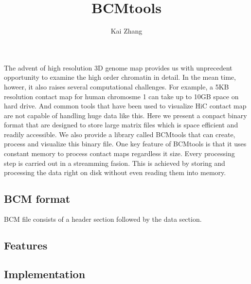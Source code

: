 \documentclass[12pt]{scrartcl}
\title{BCMtools}
\author{Kai Zhang}
\date{}
\begin{document}
\maketitle

The advent of high resolution 3D genome map provides us with unprecedent
opportunity to examine the high order chromatin in detail. In the mean time,
howeer, it
also raises several computational challenges. For example, a 5KB
resolution contact map for human chromosme 1 can take up to 10GB space on hard
drive. And common tools that have been used to visualize HiC contact map are not
capable of handling huge data like this. Here we present a conpact binary format
that are designed to store large matrix files which is space efficient and
readily accessible. We also provide a library called BCMtools that can create,
process and visualize this binary file. One key feature of BCMtools is that it
uses constant memory to process contact maps regardless it size. Every
processing step is carried out in a streamming fasion. This is
achieved by storing and processing the data right on disk without even reading
them into memory.

\subsection{BCM format}

BCM file consists of a header section followed by the data section. 

\subsection{Features}

\subsection{Implementation}



\printbibliography
\end{document}

